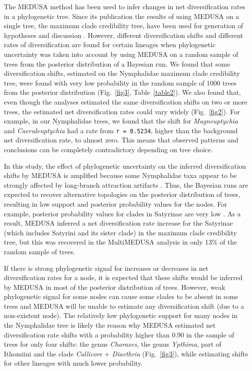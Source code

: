 \documentclass[10pt,letterpaper]{article}
\begin{document}
The MEDUSA method has been used to infer changes in net diversification
rates in a phylogenetic tree. Since its publication \cite{alfaro2009} the results
of using MEDUSA on a single tree, the maximum clade credibility tree,
have been used for generation of hypotheses and discussion
\cite{heikkila2012, litman2011, ryberg2012}. However, different diversification
shifts and different
rates of diversification are found for certain lineages when
phylogenetic uncertainty was taken into account by using MEDUSA on a
random sample of trees from the posterior distribution of a Bayesian
run. We found that some diversification shifts, estimated on the
Nymphalidae maximum clade credibility tree, were found with very low
probability in the random sample of 1000 trees from the posterior
distribution (Fig.~\ref{fig3}, Table~\ref{table2}). We also found that, even though the
analyses estimated the same diversification shifts on two or more trees,
the estimated net diversification rates could vary widely (Fig.~\ref{fig2}). For
example, in our Nymphalidae trees, we found that the shift for
\emph{Magneuptychia} and \emph{Caeruleuptychia} had a rate from
\texttt{r = 0.5234}, higher than the background net diversification
rate, to almost zero. This means that observed patterns and conclusions
can be completely contradictory depending on tree choice.

In this study, the effect of phylogenetic uncertainty on the inferred
diversification shifts by MEDUSA is amplified because some Nymphalidae
taxa appear to be strongly affected by long-branch attraction artifacts
\cite{pena2011}. Thus, the Bayesian runs are expected to recover alternative
topologies on the posterior distribution of trees, resulting in low
support and posterior probability values for the nodes. For example,
posterior probability values for clades in Satyrinae are very low
\cite{wahlberg2009}. As a result, MEDUSA inferred a net diversification rate
increase for the Satyrinae (which includes Satyrini and its sister
clade) in the maximum clade credibility tree, but this was recovered in
the MultiMEDUSA analysis in only 13\% of the random sample of trees.

If there is strong phylogenetic signal for increases or decreases in net
diversification rates for a node, it is expected that these shifts would
be inferred by MEDUSA in most of the posterior distribution of trees.
However, weak phylogenetic signal for some nodes can cause some clades
to be absent in some trees and MEDUSA will be unable to estimate any
diversification shift (due to a non-existent node).
The relatively low phylogenetic support for many nodes in the Nymphalidae
tree is likely the reason
why MEDUSA estimated net diversification rate shifts with a probability
higher than 0.90 in the sample of trees for only four shifts: the genus
\emph{Charaxes}, the genus \emph{Ypthima}, part of Ithomiini and the
clade \emph{Callicore} + \emph{Diaethria} (Fig.~\ref{fig3}), while estimating
shifts for other lineages with much lower probability.
\end{document}
